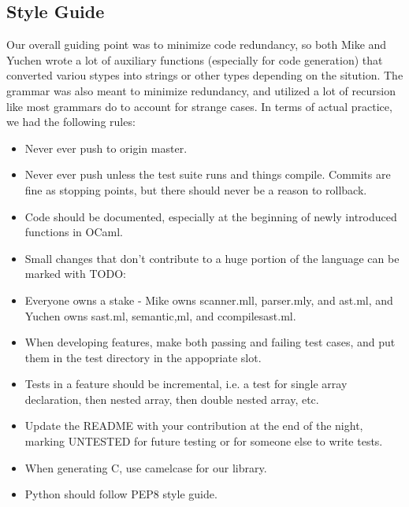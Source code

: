 \documentclass[a4paper]{article}
\begin{document}
\subsection{Style Guide}
Our overall guiding point was to minimize code redundancy, so both Mike and Yuchen wrote a lot of auxiliary functions (especially for code generation) that converted variou stypes into strings or other types depending on the sitution. The grammar was also meant to minimize redundancy, and utilized a lot of recursion like most grammars do to account for strange cases.
In terms of actual practice, we had the following rules:
\begin{itemize}
    \item Never ever push to origin master.
    \item Never ever push unless the test suite runs and things compile. Commits are fine as stopping points, but there should never be a reason to rollback.
    \item Code should be documented, especially at the beginning of newly introduced functions in OCaml.
    \item Small changes that don't contribute to a huge portion of the language can be marked with TODO:
    \item Everyone owns a stake - Mike owns scanner.mll, parser.mly, and ast.ml, and Yuchen owns sast.ml, semantic,ml, and ccompilesast.ml.
    \item When developing features, make both passing and failing test cases, and put them in the test directory in the appopriate slot.
    \item Tests in a feature should be incremental, i.e. a test for single array declaration, then nested array, then double nested array, etc.
    \item Update the README with your contribution at the end of the night, marking UNTESTED for future testing or for someone else to write tests.
    \item When generating C, use camelcase for our library.
    \item Python should follow PEP8 style guide.
\end{itemize}
\end{document}
